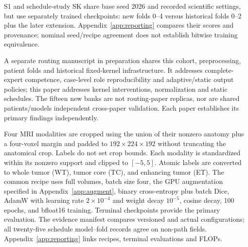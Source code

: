 \documentclass[mathematics,article,submit,pdftex,moreauthors]{Definitions/mdpi}
\begin{document}
S1 and schedule-study SK share base seed 2026 and recorded scientific settings,
but use separately trained checkpoints: new folds 0--4 versus historical
folds 0--2 plus the later extension. Appendix~\ref{app:reporting} compares
their scores and provenance; nominal seed/recipe agreement does not establish
bitwise training equivalence.

A separate routing manuscript in preparation shares this cohort,
preprocessing, patient folds and historical fixed-kernel infrastructure.
It addresses complete-expert competence, case-level role reproducibility and
adaptive/static output policies; this paper addresses kernel interventions,
normalization and static schedules. The fifteen new banks are not routing-paper
replicas, nor are shared patients/models independent cross-paper validation.
Each paper establishes its primary findings independently.

Four MRI modalities are cropped using the union of their nonzero anatomy
plus a four-voxel margin and padded to $192\times224\times192$ without
truncating the anatomical crop. Labels do not set crop bounds. Each modality
is standardized within its nonzero support and clipped to $[-5,5]$.
Atomic labels are converted to whole tumor (WT), tumor core (TC), and
enhancing tumor (ET). The common recipe uses full volumes, batch size four,
the GPU augmentation specified in Appendix~\ref{app:augment}, binary
cross-entropy plus batch Dice, AdamW with
learning rate $2\times10^{-4}$ and weight decay $10^{-5}$, cosine decay,
100 epochs, and bfloat16 training. Terminal checkpoints provide the primary
evaluation. The evidence manifest compares versioned and actual configurations;
all twenty-five schedule model--fold records agree on non-path fields.
Appendix~\ref{app:reporting} links recipes, terminal evaluations and FLOPs.
\end{document}
